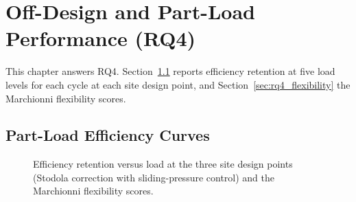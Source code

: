 \chapter{Off-Design and Part-Load Performance (RQ4)}
\label{ch:results_rq4}

This chapter answers RQ4. Section~\ref{sec:rq4_partload} reports efficiency
retention at five load levels for each cycle at each site design point, and
Section~\ref{sec:rq4_flexibility} the Marchionni flexibility scores.

\section{Part-Load Efficiency Curves}
\label{sec:rq4_partload}

\begin{figure}[H]
\centering
{}
\caption{Efficiency retention versus load at the three site design points
(Stodola correction with sliding-pressure control) and the Marchionni
flexibility scores.}
\label{fig:offdesign}
\end{figure}

